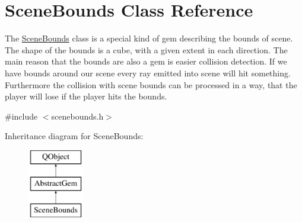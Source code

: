\hypertarget{class_scene_bounds}{\section{Scene\+Bounds Class Reference}
\label{class_scene_bounds}
}


The \hyperlink{class_scene_bounds}{Scene\+Bounds} class is a special kind of gem describing the bounds of scene. The shape of the bounds is a cube, with a given extent in each direction.  The main reason that the bounds are also a gem is easier collision detection. If we have bounds around our scene every ray emitted into scene will hit something. Furthermore the collision with scene bounds can be processed in a way, that the player will lose if the player hits the bounds.  




{\ttfamily \#include $<$scenebounds.\+h$>$}

Inheritance diagram for Scene\+Bounds\+:\begin{figure}[H]
\begin{center}
\leavevmode
\includegraphics[height=3.000000cm]{class_scene_bounds}
\end{center}
\end{figure}
